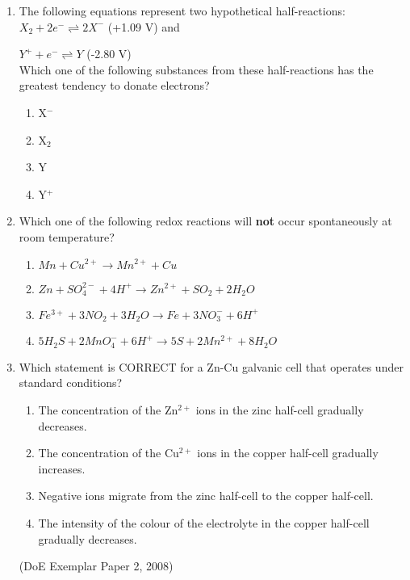 {\begin{enumerate}
\begin{enumerate}
(IEB Paper 2, 2002)

	\item{The following equations represent two hypothetical half-reactions:\\

\rm${X_{2} + 2e^{-} \rightleftharpoons 2X^{-}}$ (+1.09 V) and

\rm${Y^{+} + e^{-} \rightleftharpoons Y}$ (-2.80 V)\\

Which one of the following substances from these half-reactions has the greatest tendency to donate electrons?}

		\begin{enumerate}
		\item{X$^{-}$}
		\item{X$_{2}$}
		\item{Y}
		\item{Y$^{+}$}
		\end{enumerate}


	\item{Which one of the following redox reactions will \textbf{not} occur spontaneously at room temperature?}

		\begin{enumerate}
		\item{\rm${Mn + Cu^{2+} \rightarrow Mn^{2+} + Cu}$}
		\item{\rm${Zn + SO_{4}^{2-} + 4H^{+} \rightarrow Zn^{2+} + SO_{2} + 2H_{2}O}$}
		\item{\rm${Fe^{3+} + 3NO_{2} + 3H_{2}O \rightarrow Fe + 3NO_{3}^{-} + 6H^{+}}$}
		\item{\rm${5H_{2}S + 2MnO_{4}^{-} + 6H^{+}\rightarrow 5S + 2Mn^{2+} + 8H_{2}O}$}
		\end{enumerate}

	\item{Which statement is CORRECT for a Zn-Cu galvanic cell that operates under standard conditions?}
		\begin{enumerate}
		\item{The concentration of the Zn$^{2+}$ ions in the zinc half-cell gradually decreases.}
		\item{The concentration of the Cu$^{2+}$ ions in the copper half-cell gradually increases.}
		\item{Negative ions migrate from the zinc half-cell to the copper half-cell.}
		\item{The intensity of the colour of the electrolyte in the copper half-cell gradually decreases.}
		\end{enumerate}
(DoE Exemplar Paper 2, 2008)


\end{enumerate}
\end{enumerate}}
